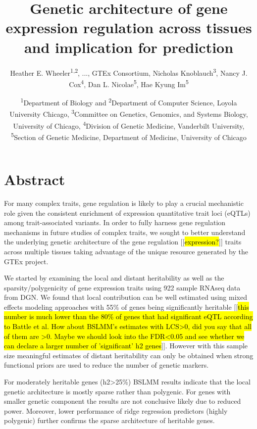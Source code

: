 \documentclass[]{article}
\title{Genetic architecture of gene expression regulation across tissues and implication for prediction}
\author{Heather E. Wheeler\textsuperscript{1,2}, ..., GTEx Consortium, Nicholas
Knoblauch\textsuperscript{3}, Nancy J. Cox\textsuperscript{4}, Dan L.
Nicolae\textsuperscript{5}, Hae Kyung Im\textsuperscript{5}}
\date{ \textsuperscript{1}Department of Biology and
\textsuperscript{2}Department of Computer Science, Loyola University
Chicago, \textsuperscript{3}Committee on Genetics, Genomics, and Systems
Biology, University of Chicago, \textsuperscript{4}Division of Genetic
Medicine, Vanderbilt University, \textsuperscript{5}Section of Genetic
Medicine, Department of Medicine, University of Chicago}
\begin{document}
\maketitle


\section{Abstract}\label{abstract}

For many complex traits, gene regulation is likely to play a crucial
mechanistic role given the consistent enrichment of expression
quantitative trait loci (eQTLs) among trait-associated variants. In
order to fully harness gene regulation mechanisms in future studies of
complex traits, we sought to better understand the underlying genetic
architecture of the gene regulation [[\hl{expression?}]] traits across multiple tissues taking advantage of the unique resource generated by the GTEx project. 

We started by examining the local and distant heritability as well as the sparsity/polygenicity of gene expression traits using 922 sample RNAseq data from DGN. We found that local contribution can be well estimated using mixed effects modeling approaches with 55\% of genes being significantly heritable [[\hl{this number is much lower than the 80\% of genes that had significant eQTL according to Battle et al. How about BSLMM's estimates with LCS>0, did you say that all of them are >0. Maybe we should look into the FDR<0.05 and see whether we can declare a larger number of 'significant' h2 genes}]]. However with this sample size meaningful estimates of distant heritability can only be obtained when strong functional priors are used to reduce the number of genetic markers.

For moderately heritable genes (h2>25\%) BSLMM results indicate that the local genetic architecture is mostly sparse rather than polygenic. For genes with smaller genetic component the results are not conclusive likely due to reduced power. Moreover, lower performance of ridge regression predictors (highly polygenic) further confirms the sparse architecture of heritable genes.

\end{document}
